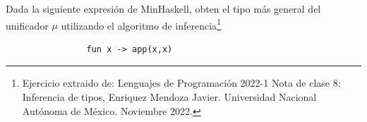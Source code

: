      \bigskip

    \begin{exercise} Dada la siguiente expresión de MinHaskell, obten el tipo más general del unificador $\mu$ utilizando el algoritmo de inferencia\footnote{Ejercicio extraido de: Lenguajes de Programación 2022-1 Nota de clase 8: Inferencia de tipos, Enriquez Mendoza Javier. Universidad Nacional Autónoma de México. Noviembre 2022. }
           \begin{lstlisting}
                fun x -> app(x,x)
           \end{lstlisting} 
    \end{exercise}